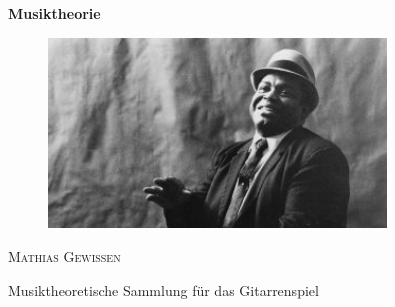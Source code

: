 \begin{titlepage}

    \vspace{20mm}

    \centering
    \huge\textbf{Musiktheorie}\par
    \vspace{3mm}

    \begin{figure}[htbp]
        \centering
        \includegraphics[width=0.8\textwidth]{images/title_img}
    \end{figure}

    \vspace{3mm}
    \textsc{\LARGE{Mathias Gewissen}}\par
    \vspace{3mm}
    \large Musiktheoretische Sammlung für das Gitarrenspiel \par

\end{titlepage}